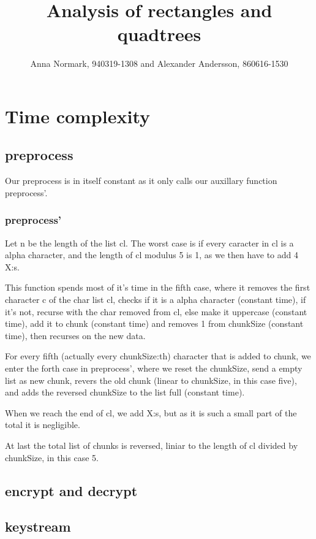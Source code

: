 \documentclass[12pt, a4paper]{article}
\title{Analysis of rectangles and quadtrees}
\author{Anna Normark, 940319-1308 and Alexander Andersson, 860616-1530}
\begin{document}
\maketitle

\section{Time complexity}




\subsection{preprocess}
Our preprocess is in itself constant as it only calls our auxillary function preprocess'.
\subsubsection{preprocess'}
Let n be the length of the list cl. The worst case is if every caracter in cl is a alpha character, and the length of cl modulus 5 is 1, as we then have to add 4 X:s.

This function spends most of it's time in the fifth case, where it removes the first character c of the char list cl, checks if it is a alpha character (constant time), if it's not, recurse with the char removed from cl, else make it uppercase (constant time), add it to chunk (constant time) and removes 1 from chunkSize (constant time), then recurses on the new data.

For every fifth (actually every chunkSize:th) character that is added to chunk, we enter the forth case in preprocess', where we reset the chunkSize, send a empty list as new chunk, revers the old chunk (linear to chunkSize, in this case five), and adds the reversed chunkSize to the list full (constant time).

When we reach the end of cl, we add X:s, but as it is such a small part of the total it is negligible.

At last the total list of chunks is reversed, liniar to the length of cl divided by chunkSize, in this case 5.

\subsection{encrypt and decrypt}




\subsection{keystream}
\end{document}
